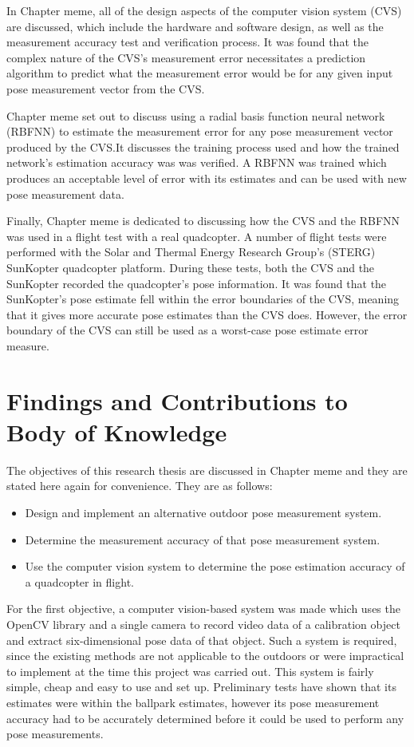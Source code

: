 In Chapter meme, all of the design aspects of the computer vision system (CVS) are discussed, which include the hardware and software design, as well as the measurement accuracy test and verification process. It was found that the complex nature of the CVS's measurement error necessitates a prediction algorithm to predict what the measurement error would be for any given input pose measurement vector from the CVS.\@ 

Chapter meme set out to discuss using a radial basis function neural network (RBFNN) to estimate the measurement error for any pose measurement vector produced by the CVS.\@ It discusses the training process used and how the trained network's estimation accuracy was was verified. A RBFNN was trained which produces an acceptable level of error with its estimates and can be used with new pose measurement data.

Finally, Chapter meme is dedicated to discussing how the CVS and the RBFNN was used in a flight test with a real quadcopter. A number of flight tests were performed with the Solar and Thermal Energy Research Group's (STERG) SunKopter quadcopter platform. During these tests, both the CVS and the SunKopter recorded the quadcopter's pose information. It was found that the SunKopter's pose estimate fell within the error boundaries of the CVS, meaning that it gives more accurate pose estimates than the CVS does. However, the error boundary of the CVS can still be used as a worst-case pose estimate error measure. 

\section{Findings and Contributions to Body of Knowledge}

The objectives of this research thesis are discussed in Chapter meme and they are stated here again for convenience. They are as follows:

\begin{itemize}
  \item Design and implement an alternative outdoor pose measurement system.
  \item Determine the measurement accuracy of that pose measurement system.
  \item Use the computer vision system to determine the pose estimation accuracy of a quadcopter in flight. 
\end{itemize}

For the first objective, a computer vision-based system was made which uses the OpenCV library and a single camera to record video data of a calibration object and extract six-dimensional pose data of that object. Such a system is required, since the existing methods are not applicable to the outdoors or were impractical to implement at the time this project was carried out. This system is fairly simple, cheap and easy to use and set up. Preliminary tests have shown that its estimates were within the ballpark estimates, however its pose measurement accuracy had to be accurately determined before it could be used to perform any pose measurements. 

